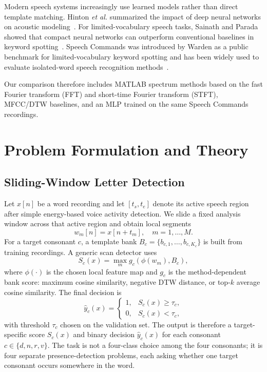 \documentclass[conference]{IEEEtran}
\begin{document}
Modern speech systems increasingly use learned models rather than direct template matching. Hinton \textit{et al.} summarized the impact of deep neural networks on acoustic modeling~\cite{hinton2012dnn}. For limited-vocabulary speech tasks, Sainath and Parada showed that compact neural networks can outperform conventional baselines in keyword spotting~\cite{sainath2015cnn}. Speech Commands was introduced by Warden as a public benchmark for limited-vocabulary keyword spotting and has been widely used to evaluate isolated-word speech recognition methods~\cite{warden2018speech}.

Our comparison therefore includes MATLAB spectrum methods based on the fast Fourier transform (FFT) and short-time Fourier transform (STFT), MFCC/DTW baselines, and an MLP trained on the same Speech Commands recordings.

\section{Problem Formulation and Theory}
\subsection{Sliding-Window Letter Detection}
Let $x[n]$ be a word recording and let $[t_s,t_e]$ denote its active speech region after simple energy-based voice activity detection. We slide a fixed analysis window across that active region and obtain local segments
\begin{equation}
w_m[n] = x[n+t_m], \quad m=1,\dots,M.
\end{equation}
For a target consonant $c$, a template bank $B_c=\{b_{c,1},\dots,b_{c,K_c}\}$ is built from training recordings. A generic scan detector uses
\begin{equation}
S_c(x)=\max_m g_c(\phi(w_m),B_c),
\end{equation}
where $\phi(\cdot)$ is the chosen local feature map and $g_c$ is the method-dependent bank score: maximum cosine similarity, negative DTW distance, or top-$k$ average cosine similarity. The final decision is
\begin{equation}
\hat{y}_c(x)=
\begin{cases}
1, & S_c(x)\ge \tau_c,\\
0, & S_c(x)< \tau_c,
\end{cases}
\end{equation}
with threshold $\tau_c$ chosen on the validation set.
The output is therefore a target-specific score $S_c(x)$ and binary decision $\hat{y}_c(x)$ for each consonant $c\in\{d,n,r,v\}$. The task is not a four-class choice among the four consonants; it is four separate presence-detection problems, each asking whether one target consonant occurs somewhere in the word.
\end{document}
